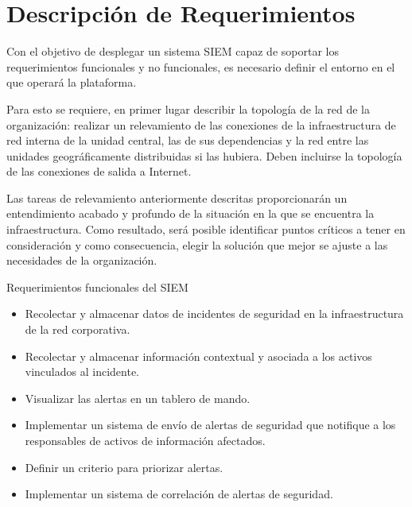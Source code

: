 \chapter{Descripción de Requerimientos}
    Con el objetivo de desplegar un sistema SIEM capaz de soportar los requerimientos funcionales y no funcionales, es necesario definir el entorno en el que operará la plataforma. \par
    Para esto se requiere, en primer lugar describir la topología de la red de la organización: realizar un relevamiento de las conexiones  de la infraestructura de red interna de la unidad central, las de sus dependencias y la red entre las unidades geográficamente distribuidas si las hubiera. Deben incluirse la topología de las conexiones de salida a Internet. \par
    Las tareas de relevamiento anteriormente descritas proporcionarán un entendimiento acabado y profundo de la situación en la que se encuentra la infraestructura. Como resultado, será posible identificar puntos críticos a tener en consideración y como consecuencia, elegir la solución que mejor se ajuste a las necesidades de la organización. \par

    \begin{section}{Requerimientos funcionales del SIEM}
    \begin{itemize}
        \item Recolectar y almacenar datos de incidentes de seguridad en la infraestructura de la red corporativa.
        \item Recolectar y almacenar información contextual y asociada a los activos vinculados  al incidente.
        \item Visualizar las alertas en un tablero de mando. 
        \item Implementar un sistema de envío de alertas de seguridad que notifique a los responsables de activos de información afectados.
        \item Definir un criterio para priorizar alertas.
        \item Implementar un sistema de correlación de alertas de seguridad.
    \end{itemize}
    \end{section}
    
